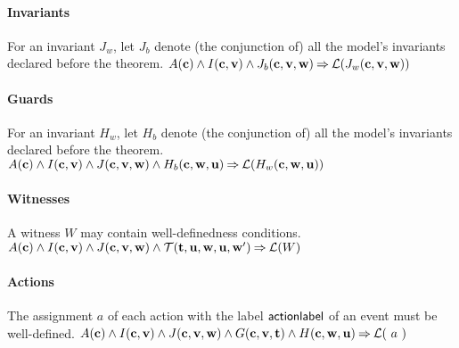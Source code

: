 \paragraph{Invariants}
\label{well_definedness_of_invariants}
For an invariant $J_w$, 
  let $J_b$ denote (the conjunction of) all the model's 
  invariants declared before the theorem.
%
  {$A(\mathbf{c}) \land I(\mathbf{c},\mathbf{v}) \land J_b(\mathbf{c},\mathbf{v},\mathbf{w})
    \mathbin\Rightarrow \mathcal{L}(J_w(\mathbf{c},\mathbf{v},\mathbf{w}))$}

\paragraph{Guards}
\label{well_definedness_of_guards}
For an invariant $H_w$, 
  let $H_b$ denote (the conjunction of) all the model's 
  invariants declared before the theorem.
%
  {$A(\mathbf{c}) \land I(\mathbf{c},\mathbf{v}) \land J(\mathbf{c},\mathbf{v},\mathbf{w}) \land
    H_b(\mathbf{c},\mathbf{w},\mathbf{u}) 
    \mathbin\Rightarrow \mathcal{L}(H_w(\mathbf{c},\mathbf{w},\mathbf{u}))$}

\paragraph{Witnesses}
\label{well_definedness_of_witnesses}
A witness $W$ may contain well-definedness conditions.
%
  {$A(\mathbf{c}) \land I(\mathbf{c},\mathbf{v}) \land J(\mathbf{c},\mathbf{v},\mathbf{w}) \land
    \mathcal{T}({\mathbf{t},\mathbf{u}},\mathbf{w},\mathbf{u},\mathbf{w}')
    \mathbin\Rightarrow \mathcal{L}(W)$}

\paragraph{Actions}
\label{well_definedness_of_actions}
The assignment $a$ of each action with the label $\textsf{actionlabel}$ of
 an event must be well-defined.
%
  {}%
  {$A(\mathbf{c}) \land I(\mathbf{c},\mathbf{v}) \land J(\mathbf{c},\mathbf{v},\mathbf{w}) \land
    G(\mathbf{c},\mathbf{v},\mathbf{t}) \land H(\mathbf{c},\mathbf{w},\mathbf{u}) \mathbin\Rightarrow \mathcal{L}(~a~)$}


